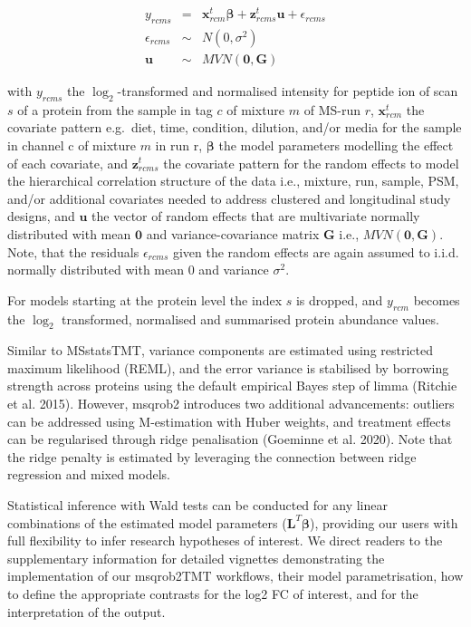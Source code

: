 \documentclass[
  letterpaper,
  DIV=11,
  numbers=noendperiod]{scrartcl}
\begin{document}
\[
\begin{array}{lcl}
y_{rcms} &=& \mathbf{x}_{rcm}^t \boldsymbol{\beta} + \mathbf{z}_{rcms}^t  \mathbf{u} +
\epsilon_{rcms}\\
\epsilon_{rcms}&\sim& N(0,\sigma^2)\\
\mathbf{u} &\sim& MVN(\mathbf{0}, \mathbf{G})
\end{array}
\]

with \(y_{rcms}\) the \(\log_2\)-transformed and normalised intensity
for peptide ion of scan \(s\) of a protein from the sample in tag \(c\)
of mixture \(m\) of MS-run \(r\), \(\mathbf{x}_{rcm}^t\) the covariate
pattern e.g.~diet, time, condition, dilution, and/or media for the
sample in channel c of mixture \(m\) in run r, \(\boldsymbol{\beta}\)
the model parameters modelling the effect of each covariate, and
\(\mathbf{z}_{rcms}^t\) the covariate pattern for the random effects to
model the hierarchical correlation structure of the data i.e., mixture,
run, sample, PSM, and/or additional covariates needed to address
clustered and longitudinal study designs, and \(\textbf{u}\) the vector
of random effects that are multivariate normally distributed with mean
\(\mathbf{0}\) and variance-covariance matrix \(\textbf{G}\) i.e.,
\(MVN(\mathbf{0}, \mathbf{G})\). Note, that the residuals
\(\epsilon_{rcms}\) given the random effects are again assumed to i.i.d.
normally distributed with mean 0 and variance \(\sigma^2\).

For models starting at the protein level the index \(s\) is dropped, and
\(y_{rcm}\) becomes the \(\log_2\) transformed, normalised and
summarised protein abundance values.

Similar to MSstatsTMT, variance components are estimated using
restricted maximum likelihood (REML), and the error variance is
stabilised by borrowing strength across proteins using the default
empirical Bayes step of limma (Ritchie et al. 2015). However, msqrob2
introduces two additional advancements: outliers can be addressed using
M-estimation with Huber weights, and treatment effects can be
regularised through ridge penalisation (Goeminne et al. 2020). Note that
the ridge penalty is estimated by leveraging the connection between
ridge regression and mixed models.

Statistical inference with Wald tests can be conducted for any linear
combinations of the estimated model parameters
(\(\mathbf{L}^T\boldsymbol{\beta}\)), providing our users with full
flexibility to infer research hypotheses of interest. We direct readers
to the supplementary information for detailed vignettes demonstrating
the implementation of our msqrob2TMT workflows, their model
parametrisation, how to define the appropriate contrasts for the log2 FC
of interest, and for the interpretation of the output.
\end{document}
